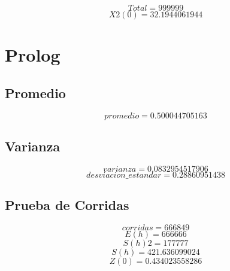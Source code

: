 \documentclass{article}
\begin{document}
$$
Total = 999999
$$
$$
X2(0) = 32.1944061944
$$
\section{Prolog}


\subsection{Promedio}
$$
promedio = 0.500044705163
$$


\subsection{Varianza}
$$
varianza = 0.0832954517906
$$
$$
desviacion\_estandar = 0.28860951438
$$


\subsection{Prueba de Corridas}
$$
corridas = 666849
$$
$$
E(h) = 666666
$$
$$
S(h)2 = 177777
$$
$$
S(h) = 421.636099024
$$
$$
Z(0) = 0.434023558286
$$
\end{document}
